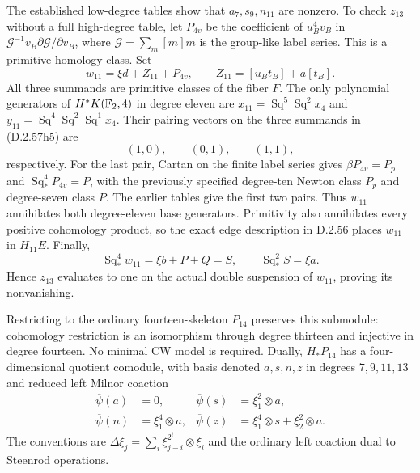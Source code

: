 The established low-degree tables show that $a_7,s_9,n_{11}$ are
nonzero. To check $z_{13}$ without a full high-degree table, let
$P_{4v}$ be the coefficient of $u_B^4v_B$ in
$\mathcal G^{-1}v_B\partial\mathcal G/\partial v_B$, where
$\mathcal G=\sum_m[m]m$ is the group-like label series. This is a
primitive homology class. Set
\[
 w_{11}=\xi d+Z_{11}+P_{4v},\qquad
 Z_{11}=[u_Bt_B]+a[t_B].
 \tag{D.2.57h5}
\]
All three summands are primitive classes of the fiber $F$. The only
polynomial generators of $H^*K(\mathbb F_2,4)$ in degree eleven are
$x_{11}=\operatorname{Sq}^5\operatorname{Sq}^2x_4$ and
$y_{11}=\operatorname{Sq}^4\operatorname{Sq}^2
\operatorname{Sq}^1x_4$. Their pairing vectors on the three
summands in \textup{(D.2.57h5)} are
\[
 (1,0),\qquad(0,1),\qquad(1,1),
 \tag{D.2.57h6}
\]
respectively. For the last pair, Cartan on the finite label series
gives $\beta P_{4v}=P_p$ and
$\operatorname{Sq}_*^4P_{4v}=P$, with the previously specified
degree-ten Newton class $P_p$ and degree-seven class $P$.
The earlier tables give the first two pairs. Thus $w_{11}$
annihilates both degree-eleven base generators. Primitivity also
annihilates every positive cohomology product, so the exact edge
description in D.2.56 places $w_{11}$ in $H_{11}E$. Finally,
\[
 \operatorname{Sq}_*^4w_{11}=\xi b+P+Q=S,
 \qquad\operatorname{Sq}_*^2S=\xi a.
 \tag{D.2.57h7}
\]
Hence $z_{13}$ evaluates to one on the actual double suspension
of $w_{11}$, proving its nonvanishing.

Restricting to the ordinary fourteen-skeleton $P_{14}$ preserves this
submodule: cohomology restriction is an isomorphism through degree
thirteen and injective in degree fourteen. No minimal CW model is
required. Dually, $H_*P_{14}$ has a four-dimensional quotient
comodule, with basis denoted $a,s,n,z$ in degrees $7,9,11,13$ and
reduced left Milnor coaction
\[
 \begin{aligned}
 \overline\psi(a)&=0,&
 \overline\psi(s)&=\xi_1^2\otimes a,\\
 \overline\psi(n)&=\xi_1^4\otimes a,&
 \overline\psi(z)&=\xi_1^4\otimes s+\xi_2^2\otimes a.
 \end{aligned}
 \tag{D.2.57h8}
\]
The conventions are
$\Delta\xi_j=\sum_i\xi_{j-i}^{2^i}\otimes\xi_i$ and the ordinary
left coaction dual to Steenrod operations.
